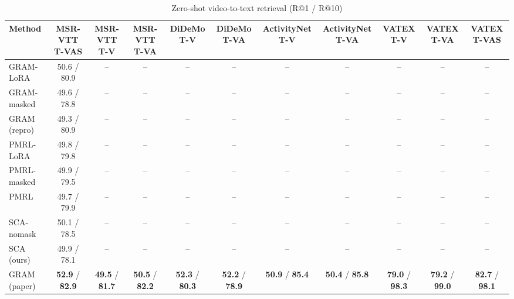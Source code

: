 \begin{table}[t]
\centering
\caption{Zero-shot video-to-text retrieval (R@1 / R@10)}
\label{tab:zeroshot_v2t}
\small
\begin{tabular}{lcccccccccc}
\toprule
Method & MSR-VTT T-VAS & MSR-VTT T-V & MSR-VTT T-VA & DiDeMo T-V & DiDeMo T-VA & ActivityNet T-V & ActivityNet T-VA & VATEX T-V & VATEX T-VA & VATEX T-VAS \\
\midrule
GRAM-LoRA & 50.6 / 80.9 & -- & -- & -- & -- & -- & -- & -- & -- & -- \\
GRAM-masked & 49.6 / 78.8 & -- & -- & -- & -- & -- & -- & -- & -- & -- \\
GRAM (repro) & 49.3 / 80.9 & -- & -- & -- & -- & -- & -- & -- & -- & -- \\
PMRL-LoRA & 49.8 / 79.8 & -- & -- & -- & -- & -- & -- & -- & -- & -- \\
PMRL-masked & 49.9 / 79.5 & -- & -- & -- & -- & -- & -- & -- & -- & -- \\
PMRL & 49.7 / 79.9 & -- & -- & -- & -- & -- & -- & -- & -- & -- \\
SCA-nomask & 50.1 / 78.5 & -- & -- & -- & -- & -- & -- & -- & -- & -- \\
SCA (ours) & 49.9 / 78.1 & -- & -- & -- & -- & -- & -- & -- & -- & -- \\
GRAM (paper) & \textbf{52.9} / \textbf{82.9} & \textbf{49.5} / \textbf{81.7} & \textbf{50.5} / \textbf{82.2} & \textbf{52.3} / \textbf{80.3} & \textbf{52.2} / \textbf{78.9} & \textbf{50.9} / \textbf{85.4} & \textbf{50.4} / \textbf{85.8} & \textbf{79.0} / \textbf{98.3} & \textbf{79.2} / \textbf{99.0} & \textbf{82.7} / \textbf{98.1} \\
\bottomrule
\end{tabular}
\end{table}
